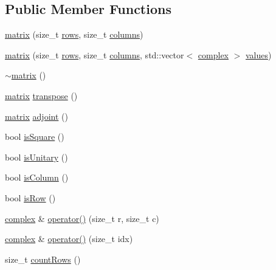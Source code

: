 \subsection*{Public Member Functions}
\begin{DoxyCompactItemize}
\item 
\hyperlink{classqlib_1_1math_1_1matrix_a6e66a3f67ecf06a42068d2dbf8885e66}{matrix} (size\+\_\+t \hyperlink{classqlib_1_1math_1_1matrix_af29b6ea4316eb972bbdc55da6e54dbb3}{rows}, size\+\_\+t \hyperlink{classqlib_1_1math_1_1matrix_ad3c2dd80c600d7bf37ae5bbdf5f056b8}{columns})
\item 
\hyperlink{classqlib_1_1math_1_1matrix_a8cbac1f2ae9917a4742cd0d147e3ba9b}{matrix} (size\+\_\+t \hyperlink{classqlib_1_1math_1_1matrix_af29b6ea4316eb972bbdc55da6e54dbb3}{rows}, size\+\_\+t \hyperlink{classqlib_1_1math_1_1matrix_ad3c2dd80c600d7bf37ae5bbdf5f056b8}{columns}, std\+::vector$<$ \hyperlink{classqlib_1_1math_1_1complex}{complex} $>$ \hyperlink{classqlib_1_1math_1_1matrix_ad764d65375ba1e50381f640bdc181c0b}{values})
\item 
\hyperlink{classqlib_1_1math_1_1matrix_afebdd1cf189728ace53a594d5ef8b750}{$\sim$matrix} ()
\item 
\hyperlink{classqlib_1_1math_1_1matrix}{matrix} \hyperlink{classqlib_1_1math_1_1matrix_af858a64510126a09b2a25fbd771cbf1c}{transpose} ()
\item 
\hyperlink{classqlib_1_1math_1_1matrix}{matrix} \hyperlink{classqlib_1_1math_1_1matrix_a1dea0a516a68c6c3e93e437a0e82ad04}{adjoint} ()
\item 
bool \hyperlink{classqlib_1_1math_1_1matrix_a7f12f7fc8d075a596978cbcdfc6106c0}{is\+Square} ()
\item 
bool \hyperlink{classqlib_1_1math_1_1matrix_ae63299aa44d564dc03fba13b928cf191}{is\+Unitary} ()
\item 
bool \hyperlink{classqlib_1_1math_1_1matrix_ad6f19b58b5940eb22eda118be1e5decd}{is\+Column} ()
\item 
bool \hyperlink{classqlib_1_1math_1_1matrix_aaae121263906f945fcbb1e8e2ee68c71}{is\+Row} ()
\item 
\hyperlink{classqlib_1_1math_1_1complex}{complex} \& \hyperlink{classqlib_1_1math_1_1matrix_a50cbbef6e5b7888aecffbf66def70154}{operator()} (size\+\_\+t r, size\+\_\+t c)
\item 
\hyperlink{classqlib_1_1math_1_1complex}{complex} \& \hyperlink{classqlib_1_1math_1_1matrix_af93c414d328b985c83c032f41f485a9a}{operator()} (size\+\_\+t idx)
\item 
size\+\_\+t \hyperlink{classqlib_1_1math_1_1matrix_add844c31055d495274b037e7bcd8f0b7}{count\+Rows} ()

\end{DoxyCompactItemize}
